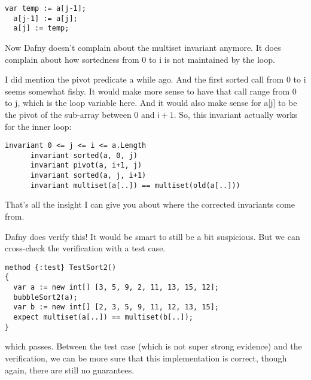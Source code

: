 \documentclass[11pt]{article}
\begin{document}
\begin{lstlisting}[language=dafny]
  var temp := a[j-1];
  a[j-1] := a[j];
  a[j] := temp;
\end{lstlisting}

Now Dafny doesn't complain about the multiset invariant anymore. It
does complain about how sortedness from 0 to \textsf{i} is not
maintained by the loop.

I did mention the \textsf{pivot} predicate a while ago. And the first \textsf{sorted} call from $0$ to \textsf{i} seems
somewhat fishy. It would make more sense to have that call range from 0 to j, which is the loop variable here.
And it would also make sense for \textsf{a[j]} to be the pivot of the sub-array between 0 and $\mathsf{i}+1$.
So, this invariant actually works for the inner loop:
\begin{lstlisting}[language=dafny]
      invariant 0 <= j <= i <= a.Length
      invariant sorted(a, 0, j)
      invariant pivot(a, i+1, j)
      invariant sorted(a, j, i+1)
      invariant multiset(a[..]) == multiset(old(a[..]))
\end{lstlisting}
That's all the insight I can give you about where the corrected invariants come from.

Dafny does verify this! It would be smart to still be a bit suspicious. But we can cross-check the verification with a test case.
\begin{lstlisting}[language=dafny]
method {:test} TestSort2()
{
  var a := new int[] [3, 5, 9, 2, 11, 13, 15, 12];
  bubbleSort2(a);
  var b := new int[] [2, 3, 5, 9, 11, 12, 13, 15];
  expect multiset(a[..]) == multiset(b[..]);
}
\end{lstlisting}
which passes. Between the test case (which is not super strong evidence) and the verification, we can be more sure that
this implementation is correct, though again, there are still no guarantees.
\end{document}
